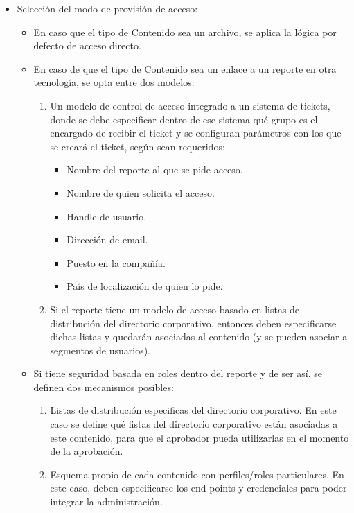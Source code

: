 \begin{itemize}
\item Selección del modo de provisión de acceso:
    \begin{itemize}
    \item En caso que el tipo de Contenido sea un archivo, se aplica la lógica por defecto de acceso directo.
	\item En caso de que el tipo de Contenido sea un enlace a un reporte en otra tecnología, se opta entre dos modelos:
    \begin{enumerate}
        \item Un modelo de control de acceso integrado a un sistema de tickets, donde se debe especificar dentro de ese sistema qué grupo es el encargado de recibir el ticket y se configuran parámetros con los que se creará el ticket, según sean requeridos:
	       \begin{itemize}
	       \item Nombre del reporte al que se pide acceso.
	       \item Nombre de quien solicita el acceso. 
		   \item Handle de usuario.
		   \item Dirección de email.
		   \item Puesto en la compañía.
		   \item País de localización de quien lo pide.
           \end{itemize}
	    \item Si el reporte tiene un modelo de acceso basado en listas de distribución del directorio corporativo, entonces deben especificarse dichas listas y quedarán asociadas al contenido (y se pueden asociar a segmentos de usuarios).
        \end{enumerate}
	\item Si tiene seguridad basada en roles dentro del reporte y de ser así, se definen dos mecanismos posibles:
        \begin{enumerate}
            \item Listas de distribución especificas del directorio corporativo. En este caso se define qué listas del directorio corporativo están asociadas a este contenido, para que el aprobador pueda utilizarlas en el momento de la aprobación.
		    \item Esquema propio de cada contenido con perfiles/roles particulares. En este caso, deben especificarse los end points y credenciales para poder integrar la administración.
        \end{enumerate}
    \end{itemize}
\end{itemize}

